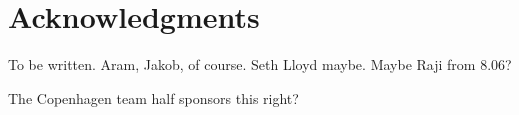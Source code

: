 

\chapter*{Acknowledgments}


To be written.
Aram, Jakob, of course.
Seth Lloyd maybe.
Maybe Raji from 8.06?

The Copenhagen team half sponsors this right?
